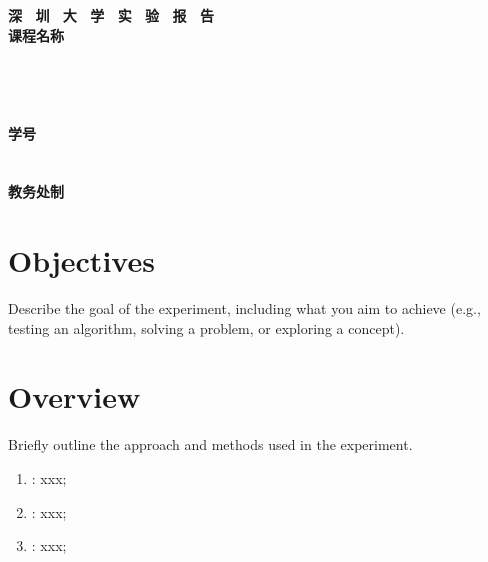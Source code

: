 \documentclass[a4paper,12pt]{article}
\begin{document}
\begin{titlepage}
    \centering
    \vspace*{2cm}
    \Huge{\textbf{深 \ 圳 \ 大 \ 学 \ 实 \ 验  \ 报 \ 告}}\\[1.5cm]
    
    {\Large\textbf{课程名称}\quad\underline{}}\\[0.5cm]
{\Large
\noindent{}
\underline{\makebox[8cm][c]{}}}\\[0.5cm]
{\Large
\noindent{}
\underline{}}\\[0.5cm]
{\Large
\noindent{}
\underline{\makebox[8cm][c]{}}}\\[0.5cm]
{\Large
\noindent{}
\underline{}}\\[0.5cm]
{\Large
\noindent{}
\underline{\makebox[3cm][c]{}}
\hspace{0.5cm}
\textbf{学号}
\underline{\makebox[3cm][c]{}}}\\[0.5cm]
{\Large
\noindent{}
\underline{\makebox[8cm][c]{}}}\\[0.5cm]
{\Large
\noindent{}
\underline{\makebox[8cm][c]{}}}\\[1.5cm]

    \vfill
    \Large{\textbf{教务处制}}
\end{titlepage}

\newpage



\section{Objectives}

Describe the goal of the experiment, including what you aim to achieve (e.g., testing an algorithm, solving a problem, or exploring a concept).


\section{Overview}
Briefly outline the approach and methods used in the experiment.
\begin{enumerate}
    \item[Spot 1]: xxx;
    \item[Spot 2]: xxx;
    \item[Spot 3]: xxx;
\end{enumerate}
\end{document}
